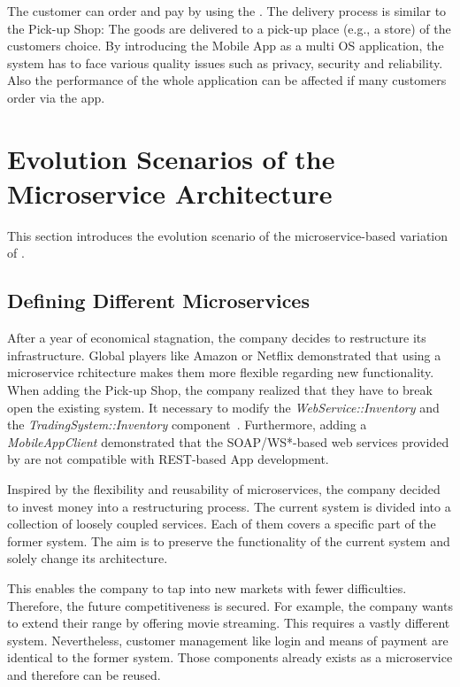The customer can order and pay by using the . 
The delivery process is similar to the Pick-up Shop: The goods are delivered to a pick-up place (e.g., a store) of the customers choice.
By introducing the Mobile App as a multi OS application, the \CoCoME system has to face various quality issues such as privacy, security and reliability. 
Also the performance of the whole application can be affected if many customers order via the app.





\section{Evolution Scenarios of the Microservice Architecture}
This section introduces the evolution scenario of the microservice-based variation of \CoCoME.
\subsection{Defining Different Microservices}
After a year of economical stagnation, the \CoCoME company decides to restructure its infrastructure. 
Global players like Amazon or Netflix demonstrated that using a microservice rchitecture makes them more flexible regarding new functionality. 
When adding the Pick-up Shop, the \CoCoME company realized that they have to break open the existing system. 
It  necessary to modify the \textit{WebService::Inventory} and the \textit{TradingSystem::Inventory} component~\cite{HeinrichRostamiReussner2016_1000052688}. 
Furthermore, adding a \textit{MobileAppClient} demonstrated that the SOAP/WS*-based web services provided by \CoCoME are not compatible with REST-based App development.

Inspired by the flexibility and reusability of microservices, the \CoCoME company decided to invest money into a restructuring process. 
The current system is divided into a collection of loosely coupled services. Each of them covers a specific part of the former \CoCoME system. 
The aim is to preserve the functionality of the current system and solely change its architecture.

This enables the company to tap into new markets with fewer difficulties. 
Therefore, the future competitiveness is secured. 
For example, the \CoCoME company wants to extend their  range by offering movie streaming.%
This requires a vastly different system. 
Nevertheless, customer management like login and means of payment are identical to the former \CoCoME system. 
Those components already exists as a microservice and therefore can be reused. 








	
	
